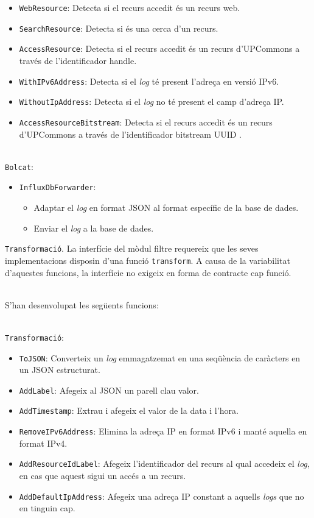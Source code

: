\begin{itemize}
    \item \texttt{WebResource}: Detecta si el recurs accedit és un recurs web.
    \item \texttt{SearchResource}: Detecta si és una cerca d’un recurs.
    \item \texttt{AccessResource}: Detecta si el recurs accedit és un recurs d’\gls{UPCommons} a través de l'identificador \gls{handle}.
    \item \texttt{WithIPv6Address}: Detecta si el \textit{\gls{log}} té present l’adreça en versió IPv6.
    \item \texttt{WithoutIpAddress}: Detecta si el \textit{\gls{log}} no té present el camp d'adreça \gls{IP}.
    \item \texttt{AccessResourceBitstream}: Detecta si el recurs accedit és un recurs d’\gls{UPCommons} a través de l'identificador \gls{bitstream} \gls{UUID} .
\end{itemize}

\noindent \\
\texttt{Bolcat}:
\begin{itemize}
    \item \texttt{InfluxDbForwarder}:
    \begin{itemize}
        \item Adaptar el \textit{\gls{log}} en format JSON al format específic de la base de dades.
        \item Enviar el \textit{\gls{log}} a la base de dades.
    \end{itemize}
\end{itemize}

\clearpage

\noindent
\texttt{Transformació}.
La interfície del mòdul filtre requereix que les seves implementacions disposin d'una funció \texttt{transform}.
A causa de la variabilitat d'aquestes funcions, la interfície no exigeix en forma de contracte cap funció.

\noindent \\
S'han desenvolupat les següents funcions:

\noindent \\
\texttt{Transformació}:
\begin{itemize}
    \item \texttt{ToJSON}: Converteix un \textit{\gls{log}} emmagatzemat en una seqüència de caràcters en un \gls{JSON} estructurat.
    \item \texttt{AddLabel}: Afegeix al JSON un parell clau valor.
    \item \texttt{AddTimestamp}: Extrau i afegeix el valor de la data i l'hora.
    \item \texttt{RemoveIPv6Address}: Elimina la adreça \gls{IP} en format IPv6 i manté aquella en format IPv4.
    \item \texttt{AddResourceIdLabel}: Afegeix l'identificador del recurs al qual accedeix el \textit{log}, en cas que aquest sigui un accés a un recurs.
    \item \texttt{AddDefaultIpAddress}: Afegeix una adreça \gls{IP} constant a aquells \textit{\gls{log}s} que no en tinguin cap.
\end{itemize}


